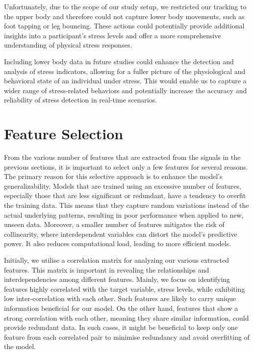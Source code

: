 Unfortunately, due to the scope of our study setup, we restricted our tracking to the upper body and therefore could not capture lower body movements, such as foot tapping or leg bouncing. These actions could potentially provide additional insights into a participant's stress levels and offer a more comprehensive understanding of physical stress responses.

Including lower body data in future studies could enhance the detection and analysis of stress indicators, allowing for a fuller picture of the physiological and behavioral state of an individual under stress. This would enable us to capture a wider range of stress-related behaviors and potentially increase the accuracy and reliability of stress detection in real-time scenarios.

\section{Feature Selection}
From the various number of features that are extracted from the signals in the previous sections, it is important to select only a few features for several reasons. The primary reason for this selective approach is to enhance the model's generalizability. Models that are trained using an excessive number of features, especially those that are less significant or redundant, have a tendency to overfit the training data. This means that they capture random variations instead of the actual underlying patterns, resulting in poor performance when applied to new, unseen data. Moreover, a smaller number of features mitigates the risk of collinearity, where interdependent variables can distort the model's predictive power. It also reduces computational load, leading to more efficient models. 

Initially, we utilise a correlation matrix for analyzing our various extracted features. This matrix is important in revealing the relationships and interdependencies among different features. Mainly, we focus on identifying features highly correlated with the target variable, stress levels, while exhibiting low inter-correlation with each other. Such features are likely to carry unique information beneficial for our model. On the other hand, features that show a strong correlation with each other, meaning they share similar information, could provide redundant data. In such cases, it might be beneficial to keep only one feature from each correlated pair to minimise redundancy and avoid overfitting of the model.

